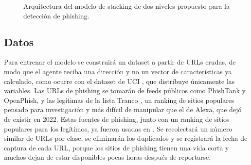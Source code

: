 \begin{figure}[t]
{}
\caption{Arquitectura del modelo de stacking de dos niveles propuesto para la detección de phishing.}
\label{fig:arquitectura}
\end{figure}

\subsection{Datos}

Para entrenar el modelo se construirá un dataset a partir de URLs crudas, de modo que el agente reciba una dirección y no un vector de características ya calculado, como ocurre con el dataset de UCI \cite{alsariera2020ai}, que distribuye únicamente las variables. Las URLs de phishing se tomarán de feeds públicos como PhishTank y OpenPhish, y las legítimas de la lista Tranco \cite{lepochat2019tranco}, un ranking de sitios populares pensado para investigación y más difícil de manipular que el de Alexa, que dejó de existir en 2022. Estas fuentes de phishing, junto con un ranking de sitios populares para los legítimos, ya fueron usadas en \cite{duy2024study}. Se recolectará un número similar de URLs por clase, se eliminarán los duplicados y se registrará la fecha de captura de cada URL, porque los sitios de phishing tienen una vida corta y muchos dejan de estar disponibles pocas horas después de reportarse.

